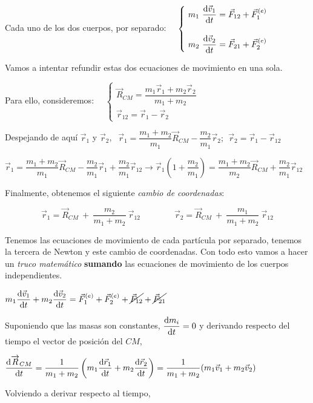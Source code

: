 Cada uno de los dos cuerpos, por separado:
$ \quad \begin{cases}
 \displaystyle \ m_1 \ \dv{\vec v_1}{t} = \vec F_{12}+\vec F_1^{(e)} \\ \\	 
 \displaystyle \ m_2 \ \dv{\vec v_2}{t} = \vec F_{21}+\vec F_2^{(e)}
 \end{cases}$
 
 Vamos a intentar refundir estas dos ecuaciones de movimiento en una sola.

Para ello, consideremos:
$ \quad \begin{cases}
 \displaystyle \overrightarrow {R}_{CM}=\dfrac {m_1 \vec r_1+m_2 \vec r_2}{m_1+m_2} \\ 
 \displaystyle \vec r_{12}=\vec r_1-\vec r_2
 \end{cases}$

Despejando de aquí $\vec r_1$ y $\vec r_2$,
$\ \  \vec r_1=\dfrac {m_1+m_2}{m_1} \vec R_{CM}-\dfrac {m_2}{m_1}\vec r_2; \ \  \vec r_2=\vec r_1-\vec r_{12}$

\small{$\vec r_1=\dfrac {m_1+m_2}{m_1} \vec R_{CM}-\dfrac {m_2}{m_1}\vec r_1+\dfrac{m_2}{m_1}\vec r_{12} \to \vec r_1\left( 1+\dfrac {m_2}{m_1} \right) =\dfrac{m_1+m_2}{m_2}\vec R_{CM} +\dfrac{m_2}{m_1}\vec r_{12}$}

\normalsize{Finalmente,} obtenemos el siguiente \emph{cambio de coordenadas}:

$$ \vec r_1 = \overrightarrow {R}_{CM}\ + \ \dfrac{m_2}{m_1+m_2}\ \vec r_{12} \qquad \qquad \vec r_2 = \overrightarrow {R}_{CM}\ + \ \dfrac{m_1}{m_1+m_2}\ \vec r_{12}$$

Tenemos las ecuaciones de movimiento de cada partícula por separado, tenemos la tercera de Newton y este cambio de coordenadas. Con todo esto vamos a hacer un \emph{truco matemático} \textbf{sumando} las ecuaciones de movimiento de los cuerpos independientes.

$\displaystyle m_1 \dv{\vec v_1}{t}+m_2 \dv{\vec v_2}{t} = \vec F_1^{(e)}+\vec F_2^{(e)}+\cancel{\vec F_{12}}+\cancel{\vec F_{21}}$

Suponiendo que las masas son constantes, $\displaystyle \dv{m_i}{t}=0$ y derivando respecto del tiempo el vector de posición del $CM$,

$\displaystyle \dv{\overrightarrow R_{CM}}{t}=\dfrac 1{m_1+m_2} \left( m_1 \dv{\vec r_1}{t} + m_2 \dv{\vec r_2}{t} \right)=\dfrac 1{m_1+m_2}(m_1\vec v_1+m_2 \vec v_2)$

Volviendo a derivar respecto al tiempo,

